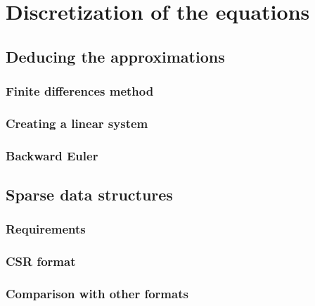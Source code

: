 \chapter{Discretization of the equations}

\section{Deducing the approximations}
	\subsection{Finite differences method}
	\subsection{Creating a linear system}
	\subsection{Backward Euler}
\section{Sparse data structures}
	\subsection{Requirements}
	\subsection{CSR format}
	\subsection{Comparison with other formats}